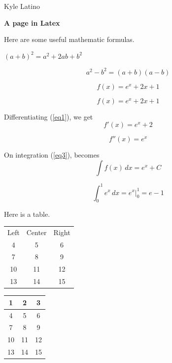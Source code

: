 \documentclass[12pt,a4paper]{article}
\author{Kyle Latino}
\begin{document}
Kyle Latino


\begin{center}
\textbf{\Large A page in Latex}
\end{center}

Here are some useful mathematic formulas.

$(a+b)^2=a^2+2ab+b^2$

$$ a^2-b^2=(a+b)(a-b) $$

\[ f(x)=e^x+2x+1 \]

\begin{equation}\label{eq1}
f(x)=e^x+2x+1
\end{equation}

Differentiating (\ref{eq1}), we get
\begin{equation}\label{eq2}
f'(x)=e^x+2
\end{equation}

\begin{equation}\label{eq3}
f''(x)=e^x
\end{equation}

On integration (\ref{eq3}), becomes
\[ \int f(x)\, dx =e^x +C \]

\[ \int_0^1 e^x\, dx = \left. e^x \right|_0^1 = e-1 \]

\noindent\hrulefill

Here is a table.

\begin{tabular}{ccc}
Left & Center & Right \\ 
4 & 5 & 6 \\ 
7 & 8 & 9 \\ 
10 & 11 & 12 \\ 
13 & 14 & 15 \\ 
\end{tabular} 

\begin{center}
\begin{tabular}{|c|c|c|}
\hline 
1 & 2 & 3 \\ 
\hline 
4 & 5 & 6 \\ 
\hline 
7 & 8 & 9 \\ 
\hline 
10 & 11 & 12 \\ 
\hline 
13 & 14 & 15 \\ 
\hline 
\end{tabular} 
\end{center}
 
\end{document}
